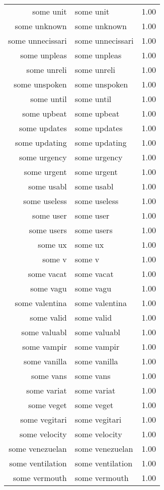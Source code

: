\begin{table}[ht]
\begin{tabular}{rlr}
  some unit & some unit & 1.00 \\ 
  some unknown & some unknown & 1.00 \\ 
  some unnecissari & some unnecissari & 1.00 \\ 
  some unpleas & some unpleas & 1.00 \\ 
  some unreli & some unreli & 1.00 \\ 
  some unspoken & some unspoken & 1.00 \\ 
  some until & some until & 1.00 \\ 
  some upbeat & some upbeat & 1.00 \\ 
  some updates & some updates & 1.00 \\ 
  some updating & some updating & 1.00 \\ 
  some urgency & some urgency & 1.00 \\ 
  some urgent & some urgent & 1.00 \\ 
  some usabl & some usabl & 1.00 \\ 
  some useless & some useless & 1.00 \\ 
  some user & some user & 1.00 \\ 
  some users & some users & 1.00 \\ 
  some ux & some ux & 1.00 \\ 
  some v & some v & 1.00 \\ 
  some vacat & some vacat & 1.00 \\ 
  some vagu & some vagu & 1.00 \\ 
  some valentina & some valentina & 1.00 \\ 
  some valid & some valid & 1.00 \\ 
  some valuabl & some valuabl & 1.00 \\ 
  some vampir & some vampir & 1.00 \\ 
  some vanilla & some vanilla & 1.00 \\ 
  some vans & some vans & 1.00 \\ 
  some variat & some variat & 1.00 \\ 
  some veget & some veget & 1.00 \\ 
  some vegitari & some vegitari & 1.00 \\ 
  some velocity & some velocity & 1.00 \\ 
  some venezuelan & some venezuelan & 1.00 \\ 
  some ventilation & some ventilation & 1.00 \\ 
  some vermouth & some vermouth & 1.00 \\ 

\end{tabular}
\end{table}
